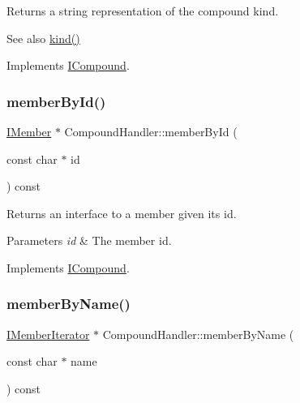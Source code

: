 Returns a string representation of the compound kind. \begin{DoxySeeAlso}{See also}
\mbox{\hyperlink{class_compound_handler_a50629ddd5869657b611c3d170dd39cdb}{kind()}} 
\end{DoxySeeAlso}


Implements \mbox{\hyperlink{class_i_compound_a49a7cb96ed8364494bdb7ecc1abb86c9}{I\+Compound}}.

\mbox{\label{class_compound_handler_ac73126f245d618162a90bc2f6906c548}} 
\subsubsection{\texorpdfstring{memberById()}{memberById()}}
{\footnotesize\ttfamily \mbox{\hyperlink{class_i_member}{I\+Member}} $\ast$ Compound\+Handler\+::member\+By\+Id (\begin{DoxyParamCaption}\item[{const char $\ast$}]{id }\end{DoxyParamCaption}) const\hspace{0.3cm}{\ttfamily [virtual]}}

Returns an interface to a member given its id. 
\begin{DoxyParams}{Parameters}
{\em id} & The member id. \\
\hline
\end{DoxyParams}


Implements \mbox{\hyperlink{class_i_compound_af30652d3b5a43722e9407c8edf9a38fb}{I\+Compound}}.

\mbox{\label{class_compound_handler_afc374b0797b025ba660c558ca1d73137}} 
\subsubsection{\texorpdfstring{memberByName()}{memberByName()}}
{\footnotesize\ttfamily \mbox{\hyperlink{class_i_member_iterator}{I\+Member\+Iterator}} $\ast$ Compound\+Handler\+::member\+By\+Name (\begin{DoxyParamCaption}\item[{const char $\ast$}]{name }\end{DoxyParamCaption}) const\hspace{0.3cm}{\ttfamily [virtual]}}

